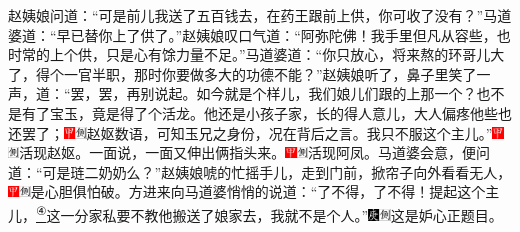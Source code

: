赵姨娘问道：``可是前儿我送了五百钱去，在药王跟前上供，你可收了没有？''马道婆道：``早已替你上了供了。''赵姨娘叹口气道：``阿弥陀佛！我手里但凡从容些，也时常的上个供，只是心有馀力量不足。''马道婆道：``你只放心，将来熬的环哥儿大了，得个一官半职，那时你要做多大的功德不能？''赵姨娘听了，鼻子里笑了一声，道：``罢，罢，再别说起。如今就是个样儿，我们娘儿们跟的上那一个？也不是有了宝玉，竟是得了个活龙。他还是小孩子家，长的得人意儿，大人偏疼他些也还罢了；{\includegraphics[width=3mm]{../Images/00002}\includegraphics[width=3mm]{../Images/00011}\footnotesize \kaishu 赵妪数语，可知玉兄之身份，况在背后之言。}我只不服这个主儿。''{\includegraphics[width=3mm]{../Images/00002}\includegraphics[width=3mm]{../Images/00011}\footnotesize \kaishu 活现赵妪。}一面说，一面又伸出俩指头来。{\includegraphics[width=3mm]{../Images/00002}\includegraphics[width=3mm]{../Images/00011}\footnotesize \kaishu 活现阿凤。}马道婆会意，便问道：``可是琏二奶奶么？''赵姨娘唬的忙摇手儿，走到门前，掀帘子向外看看无人，{\includegraphics[width=3mm]{../Images/00002}\includegraphics[width=3mm]{../Images/00011}\footnotesize \kaishu 是心胆俱怕破。}方进来向马道婆悄悄的说道：``了不得，了不得！提起这个主儿，\href{../Text/part0029_split_000.html\#lnkback_4_a}{\textsuperscript{④}}这一分家私要不教他搬送了娘家去，我就不是个人。''{\includegraphics[width=3mm]{../Images/00004}\includegraphics[width=3mm]{../Images/00011}\footnotesize \kaishu 这是妒心正题目。}

